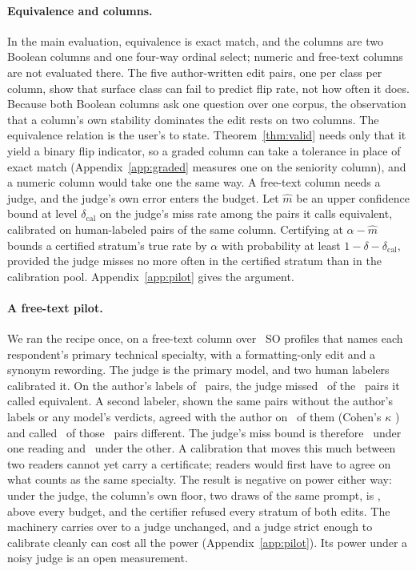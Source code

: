 \keeprunin
\paragraph{Equivalence and columns.} In the main evaluation, equivalence
is exact match, and the columns are two Boolean columns and one four-way
ordinal select; numeric and free-text columns are not evaluated there. The five
author-written edit pairs, one per class per column, show that surface
class can fail to predict flip rate, not how often it does. Because both
Boolean columns ask one question over one corpus, the observation that a
column's own stability dominates the edit rests on two columns. The
equivalence relation is the user's to state. Theorem~\ref{thm:valid}
needs only that it yield a binary flip indicator, so a graded column can
take a tolerance in place of exact match (Appendix~\ref{app:graded}
measures one on the seniority column), and a numeric column would take one the
same way. A free-text column needs a judge, and the judge's own error
enters the budget. Let $\hat{m}$ be an upper confidence bound at level
$\delta_{\mathrm{cal}}$ on the judge's miss rate among the pairs it calls
equivalent, calibrated on human-labeled pairs of the same column.
Certifying at $\alpha - \hat{m}$ bounds a certified stratum's true rate
by $\alpha$ with probability at least
$1 - \delta - \delta_{\mathrm{cal}}$, provided the judge misses no more
often in the certified stratum than in the calibration pool.
\ifnum{}\relax Appendix~\ref{app:pilot} gives the
argument.

\keeprunin
\paragraph{A free-text pilot.} We ran the recipe once, on a free-text
column over \pilotRows\ SO profiles that names each respondent's primary
technical specialty, with a formatting-only edit and a synonym
rewording. The judge is the primary model, and two human labelers
calibrated it. On the author's labels of \pilotLabeled\ pairs, the judge
missed \pilotMisses\ of the \pilotLabeledSame\ pairs it called
equivalent. A second labeler, shown the same pairs without the author's
labels or any model's verdicts, agreed with the author on
\pilotSecondAgree\ of them (Cohen's $\kappa$ \pilotSecondKappa) and
called \pilotSecondMisses\ of those \pilotLabeledSame\ pairs different.
The judge's miss bound is therefore \pilotMissUcb\ under one reading and
\pilotSecondMissUcb\ under the other. A calibration that moves this much
between two readers cannot yet carry a certificate; readers would first
have to agree on what counts as the same specialty. The result is negative on power either way: under the judge,
the column's own floor, two draws of the same prompt, is
\pilotFloorRate, above every budget, and the certifier refused every
stratum of both edits. The machinery carries over to a judge unchanged,
and a judge strict enough to calibrate cleanly can cost all the power
(Appendix~\ref{app:pilot}).
\else Its power under a noisy judge is an open measurement.
\fi

